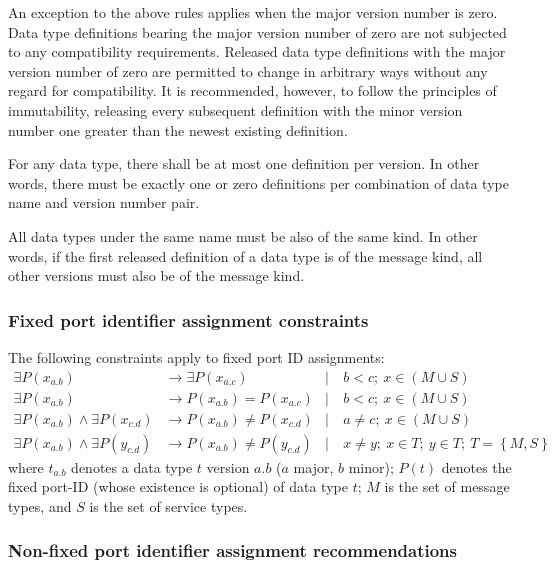 An exception to the above rules applies when the major version number is zero.
Data type definitions bearing the major version number of zero are not subjected to any compatibility requirements.
Released data type definitions with the major version number of zero are permitted to change in arbitrary
ways without any regard for compatibility.
It is recommended, however, to follow the principles of immutability, releasing every subsequent definition
with the minor version number one greater than the newest existing definition.

For any data type, there shall be at most one definition per version.
In other words, there must be exactly one or zero definitions
per combination of data type name and version number pair.

All data types under the same name must be also of the same kind.
In other words, if the first released definition of a data type is of the message kind,
all other versions must also be of the message kind.

\subsubsection{Fixed port identifier assignment constraints}

The following constraints apply to fixed port ID assignments:
\begin{align*}
    \exists P(x_{a.b})                          &\rightarrow \exists P(x_{a.c})
    &\mid&\ b < c;\ x \in (M \cup S)
    \\
    \exists P(x_{a.b})                          &\rightarrow         P(x_{a.b}) =    P(x_{a.c})
    &\mid&\ b < c;\ x \in (M \cup S)
    \\
    \exists P(x_{a.b}) \land \exists P(x_{c.d}) &\rightarrow         P(x_{a.b}) \neq P(x_{c.d})
    &\mid&\ a \neq c;\ x \in (M \cup S)
    \\
    \exists P(x_{a.b}) \land \exists P(y_{c.d}) &\rightarrow         P(x_{a.b}) \neq P(y_{c.d})
    &\mid&\ x \neq y;\ x \in T;\ y \in T;\ T = \left\{ M, S \right\}
\end{align*}
where $t_{a.b}$ denotes a data type $t$ version $a.b$ ($a$ major, $b$ minor);
$P(t)$ denotes the fixed port-ID (whose existence is optional) of data type $t$;
$M$ is the set of message types, and $S$ is the set of service types.

\subsubsection{Non-fixed port identifier assignment recommendations}

